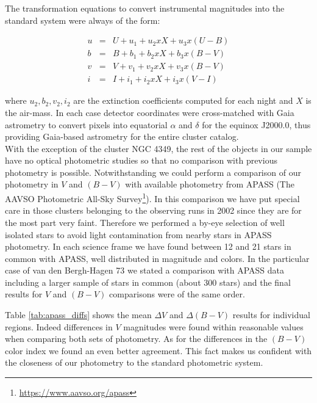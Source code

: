 \documentclass[draft]{aa}
\begin{document}
The transformation equations to convert instrumental magnitudes into the
standard system were always of the form:

\begin{eqnarray*}
    u & = & U+u_1+u_2xX+u_3x(U-B) \\
    b & = & B+b_1+b_2xX+b_3x(B-V) \\
    v & = & V+v_1+v_2xX+v_3x(B-V) \\
    i & = & I+i_1+i_2xX+i_3x(V-I)
\end{eqnarray*}

where $u_2, b_2, v_2, i_2$ are the extinction coefficients computed for each
night and $X$ is the air-mass. In each case detector coordinates were
cross-matched with Gaia astrometry to convert pixels into
equatorial $\alpha$ and $\delta$ for the equinox J2000.0, thus providing
Gaia-based astrometry for the entire cluster catalog.\\

With the exception of the cluster NGC 4349, the rest of the objects in our
sample have no optical photometric studies so that no comparison with previous
photometry is possible. Notwithstanding we could perform a comparison of our
photometry in $V$ and $(B-V)$ with available photometry from APASS (The AAVSO
Photometric All-Sky Survey\footnote{\url{https://www.aavso.org/apass}}).
In this comparison we have put special care in those clusters belonging to the
observing runs in 2002 since they are for the most part very faint. Therefore
we performed a by-eye selection of well isolated stars to avoid light
contamination from nearby stars in APASS photometry. In each science frame we
have found between 12 and 21 stars in common with APASS, well distributed in
magnitude and colors.
In the particular case of van den Bergh-Hagen 73 we stated a comparison with
APASS data including a larger sample of stars in common (about 300 stars) and
the final results for $V$ and $(B-V)$ comparisons were of the same order.

Table \ref{tab:apass_diffs} shows the mean $\Delta V$ and $\Delta(B-V)$ results
for individual regions. Indeed differences in $V$ magnitudes were found within
reasonable values when comparing both sets of photometry. As for the
differences in the $(B-V)$ color index we found an even better agreement. This
fact makes us confident with the closeness of our photometry to the standard
photometric system.\\
\end{document}
